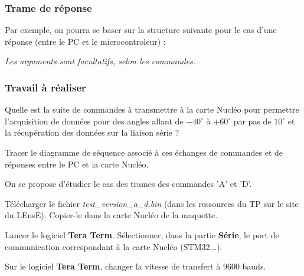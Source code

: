 \documentclass[a4paper,11pt,titlepage]{article} %
\begin{document}
\subsubsection{Trame de réponse}

Par exemple, on pourra se baser sur la structure suivante pour le cas d'une réponse (entre le PC et le microcontroleur) :

\begin{center}
\end{center}

\textit{Les arguments sont facultatifs, selon les commandes.}


\subsubsection{Travail à réaliser}

\Quest Quelle est la suite de commandes à transmettre à la carte Nucléo pour permettre l'acquisition de données pour des angles allant de $-40^\circ{}$ à $+60^\circ{}$ par pas de $10^\circ{}$ et la récupération des données sur la liaison série ?

\Quest Tracer le diagramme de séquence associé à ces échanges de commandes et de réponses entre le PC et la carte Nucléo.

\medskip

On se propose d'étudier le cas des trames des commandes 'A' et 'D'.

\Manip Télécharger le fichier \textsl{test\_version\_a\_d.bin} (dans les ressources du TP sur le site du LEnsE). Copier-le dans la carte Nucléo de la maquette.

\medskip

\Manip Lancer le logiciel \textbf{Tera Term}. Sélectionner, dans la partie \textbf{Série}, le port de communication correspondant à la carte Nucléo (STM32...).

\Manip Sur le logiciel \textbf{Tera Term}, changer la vitesse de transfert à 9600 bauds.
\end{document}
